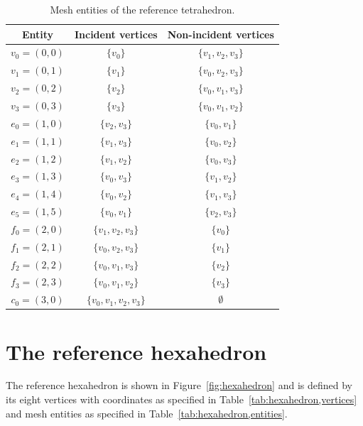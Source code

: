 \begin{table}[H]
\linespread{1.2}\selectfont
  \begin{center}
    \begin{tabular}{|c|c|c|}
      \hline
      Entity & Incident vertices & Non-incident vertices \\
      \hline
      \hline
      $v_0 = (0, 0)$ & $\{v_0\}$ & $\{v_1, v_2, v_3\}$ \\
      \hline
      $v_1 = (0, 1)$ & $\{v_1\}$ & $\{v_0, v_2, v_3\}$ \\
      \hline
      $v_2 = (0, 2)$ & $\{v_2\}$ & $\{v_0, v_1, v_3\}$ \\
      \hline
      $v_3 = (0, 3)$ & $\{v_3\}$ & $\{v_0, v_1, v_2\}$ \\
      \hline
      $e_0 = (1, 0)$ & $\{v_2, v_3\}$ & $\{v_0, v_1\}$ \\
      \hline
      $e_1 = (1, 1)$ & $\{v_1, v_3\}$ & $\{v_0, v_2\}$ \\
      \hline
      $e_2 = (1, 2)$ & $\{v_1, v_2\}$ & $\{v_0, v_3\}$ \\
      \hline
      $e_3 = (1, 3)$ & $\{v_0, v_3\}$ & $\{v_1, v_2\}$ \\
      \hline
      $e_4 = (1, 4)$ & $\{v_0, v_2\}$ & $\{v_1, v_3\}$ \\
      \hline
      $e_5 = (1, 5)$ & $\{v_0, v_1\}$ & $\{v_2, v_3\}$ \\
      \hline
      $f_0 = (2, 0)$ & $\{v_1, v_2, v_3\}$ & $\{v_0\}$ \\
      \hline
      $f_1 = (2, 1)$ & $\{v_0, v_2, v_3\}$ & $\{v_1\}$ \\
      \hline
      $f_2 = (2, 2)$ & $\{v_0, v_1, v_3\}$ & $\{v_2\}$ \\
      \hline
      $f_3 = (2, 3)$ & $\{v_0, v_1, v_2\}$ & $\{v_3\}$ \\
      \hline
      $c_0 = (3, 0)$ & $\{v_0, v_1, v_2, v_3\}$ & $\emptyset$ \\
      \hline
    \end{tabular}
    \caption{Mesh entities of the reference tetrahedron.}
        \label{tab:tetrahedron,entities} 
  \end{center}
\end{table}

\newpage
\section{The reference hexahedron}

The reference hexahedron is shown in Figure~\ref{fig:hexahedron} and
is defined by its eight vertices with coordinates as specified in
Table~\ref{tab:hexahedron,vertices} and mesh entities as specified in
Table~\ref{tab:hexahedron,entities}.

